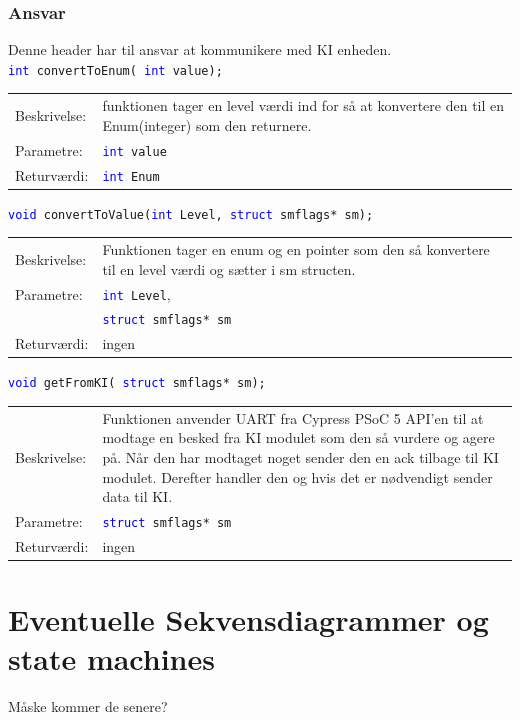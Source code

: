 \subsubsection{Ansvar}
Denne header har til ansvar at kommunikere med KI enheden.\\
\texttt{\textcolor{blue}{int} convertToEnum( \textcolor{blue}{int} value);} 
\begin{table}[H]
\begin{tabular}{l p{12.5cm}}
\hline
Beskrivelse:& funktionen tager en level værdi ind for så at konvertere den til en Enum(integer) som den returnere.\\
Parametre:&\texttt{\textcolor{blue}{int} value}\\
Returværdi:&\texttt{\textcolor{blue}{int} Enum}\\
\end{tabular}
\end{table}
\texttt{\textcolor{blue}{void} convertToValue(\textcolor{blue}{int} Level,   \textcolor{blue}{struct} smflags* sm);} 
\begin{table}[H]
\begin{tabular}{l p{12.5cm}}
\hline
Beskrivelse:& Funktionen tager en enum og en pointer som den så konvertere til en level værdi og sætter i sm structen.\\
Parametre:&\texttt{\textcolor{blue}{int} Level},\\
 &\texttt{\textcolor{blue}{struct} smflags* sm}\\
Returværdi:&ingen\\
\end{tabular}
\end{table}
\texttt{\textcolor{blue}{void} getFromKI( \textcolor{blue}{struct} smflags* sm);} 
\begin{table}[H]
\begin{tabular}{l p{12.5cm}}
\hline
Beskrivelse:& Funktionen anvender UART fra Cypress PSoC 5 API'en til at modtage en besked fra KI modulet som den så vurdere og agere på. Når den har modtaget noget sender den en ack tilbage til KI modulet. Derefter handler den og hvis det er nødvendigt sender data til KI. \\
Parametre:&\texttt{\textcolor{blue}{struct} smflags* sm}\\
Returværdi:&ingen\\
\end{tabular}
\end{table}
\section{Eventuelle Sekvensdiagrammer og state machines}
Måske kommer de senere?